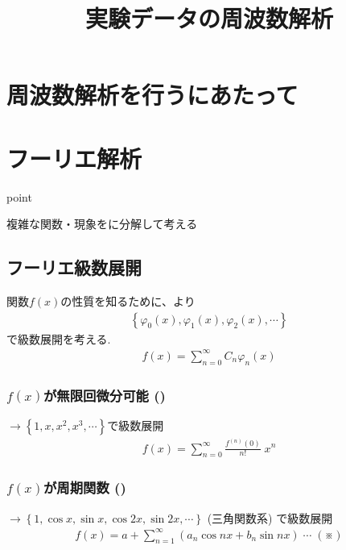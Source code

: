 \documentclass[a4paper]{jsarticle}
\author{}
\title{実験データの周波数解析}
\date{}
\begin{document}
\maketitle
\section{周波数解析を行うにあたって}
\section{フーリエ解析}
\begin{itembox}[l]{point}
    \begin{center}
        複雑な関数・現象をに分解して考える
    \end{center}
\end{itembox}
\subsection{フーリエ級数展開}
関数$f\left(x\right)$の性質を知るために、より
\begin{eqnarray*}
    \left\{\varphi_0\left(x\right),\varphi_1\left(x\right),\varphi_2\left(x\right),\cdots\right\}
\end{eqnarray*}
で級数展開を考える.
\begin{eqnarray*}
    f\left(x\right)=\sum^\infty_{n=0}C_n\varphi_n\left(x\right)
\end{eqnarray*}
\subsubsection*{$f\left(x\right)$が無限回微分可能 ()}
$\rightarrow\left\{1,x,x^2,x^3,\cdots\right\}$で級数展開
\begin{eqnarray*}
    f\left(x\right) = \sum^\infty_{n=0}\frac{f^{\left(n\right)}\left(0\right)}{n!}\;x^n
\end{eqnarray*}
\subsubsection*{$f\left(x\right)$が周期関数 ()}
$\rightarrow\left\{1,\cos x,\sin x,\cos 2x, \sin 2x,\cdots\right\}$ (三角関数系) で級数展開
\begin{eqnarray*}
    f\left(x\right) = a + \sum^\infty_{n=1}\left(a_n \cos nx+b_n \sin nx\right)\;\cdots\; \left(※\right)
\end{eqnarray*}
\end{document}
